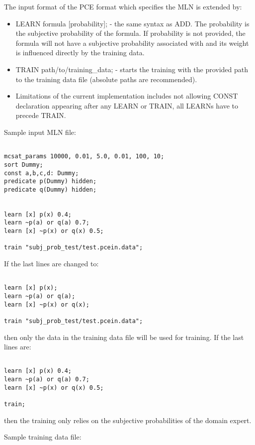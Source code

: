 \documentclass[12pt]{article}
\begin{document}
The input format of the PCE format which specifies the MLN is extended by:
\begin{itemize}
   \item LEARN formula [probability]; - the same syntax as ADD. 
        The probability is the subjective probability of the formula.
        If probability is not provided, the formula will not have a subjective
        probability associated with and its weight is influenced directly 
        by the training data.  
   \item TRAIN path/to/training\_data; - starts the training with the provided
       path to the training data file (absolute paths are recommended).
   \item Limitations of the current implementation includes not allowing 
       CONST declaration appearing after any LEARN or TRAIN, all LEARNs have
       to precede TRAIN.
\end{itemize}

\noindent
Sample input MLN file:
\begin{verbatim}

mcsat_params 10000, 0.01, 5.0, 0.01, 100, 10;
sort Dummy;
const a,b,c,d: Dummy;
predicate p(Dummy) hidden;
predicate q(Dummy) hidden;


learn [x] p(x) 0.4;
learn ~p(a) or q(a) 0.7;
learn [x] ~p(x) or q(x) 0.5;

train "subj_prob_test/test.pcein.data";

\end{verbatim}

If the last lines are changed to:
\begin{verbatim}

learn [x] p(x);
learn ~p(a) or q(a);
learn [x] ~p(x) or q(x);

train "subj_prob_test/test.pcein.data";

\end{verbatim}

then only the data in the training data file will be used for training.
If the last lines are:
\begin{verbatim}

learn [x] p(x) 0.4;
learn ~p(a) or q(a) 0.7;
learn [x] ~p(x) or q(x) 0.5;

train;

\end{verbatim}
then the training only relies on the subjective probabilities of the 
domain expert.

\noindent
Sample training data file:
\end{document}
